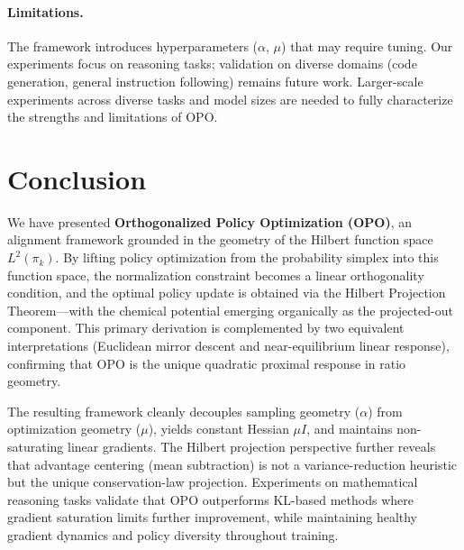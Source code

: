 \documentclass[11pt]{article}
\theoremstyle{definition}
\theoremstyle{remark}
\newcommand{\pik}{\pi_k}
\begin{document}
\paragraph{Limitations.}
The framework introduces hyperparameters ($\alpha$, $\mu$) that may require tuning. Our experiments focus on reasoning tasks; validation on diverse domains (code generation, general instruction following) remains future work. Larger-scale experiments across diverse tasks and model sizes are needed to fully characterize the strengths and limitations of OPO.

\section{Conclusion}

We have presented \textbf{Orthogonalized Policy Optimization (OPO)}, an alignment framework grounded in the geometry of the Hilbert function space $L^2(\pik)$. By lifting policy optimization from the probability simplex into this function space, the normalization constraint becomes a linear orthogonality condition, and the optimal policy update is obtained via the Hilbert Projection Theorem---with the chemical potential emerging organically as the projected-out component. This primary derivation is complemented by two equivalent interpretations (Euclidean mirror descent and near-equilibrium linear response), confirming that OPO is the unique quadratic proximal response in ratio geometry.

The resulting framework cleanly decouples sampling geometry ($\alpha$) from optimization geometry ($\mu$), yields constant Hessian $\mu I$, and maintains non-saturating linear gradients. The Hilbert projection perspective further reveals that advantage centering (mean subtraction) is not a variance-reduction heuristic but the unique conservation-law projection. Experiments on mathematical reasoning tasks validate that OPO outperforms KL-based methods where gradient saturation limits further improvement, while maintaining healthy gradient dynamics and policy diversity throughout training.
\end{document}
